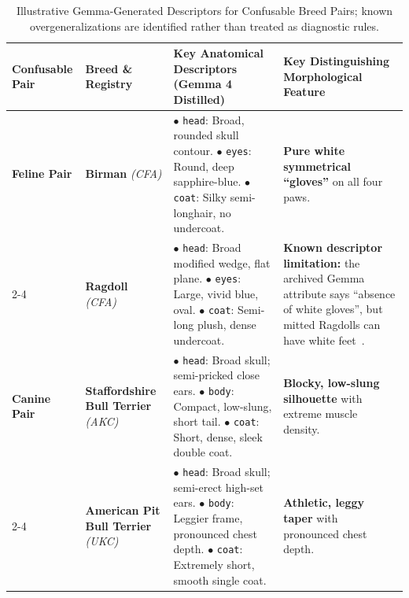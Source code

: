 \documentclass[conference]{IEEEtran}
\begin{document}
\begin{table}[t]
\centering
\caption{Illustrative Gemma-Generated Descriptors for Confusable Breed Pairs; known overgeneralizations are identified rather than treated as diagnostic rules.}
\label{tab:confusable_descriptors}
\vspace{2pt}
\footnotesize
\setlength{\tabcolsep}{5pt}
\renewcommand{\arraystretch}{1.05}
\begin{tabularx}{\textwidth}{p{1.8cm} p{2.2cm} p{6.8cm} X}
\toprule
\textbf{Confusable Pair} & \textbf{Breed \& Registry} & \textbf{Key Anatomical Descriptors (Gemma 4 Distilled)} & \textbf{Key Distinguishing Morphological Feature} \\
\midrule
\textbf{Feline Pair} & \textbf{Birman} \emph{(CFA)} & 
$\bullet$ \texttt{head}: Broad, rounded skull contour.\newline
$\bullet$ \texttt{eyes}: Round, deep sapphire-blue.\newline
$\bullet$ \texttt{coat}: Silky semi-longhair, no undercoat. & 
\textbf{Pure white symmetrical ``gloves''} on all four paws. \\
\cmidrule{2-4}
& \textbf{Ragdoll} \emph{(CFA)} & 
$\bullet$ \texttt{head}: Broad modified wedge, flat plane.\newline
$\bullet$ \texttt{eyes}: Large, vivid blue, oval.\newline
$\bullet$ \texttt{coat}: Semi-long plush, dense undercoat. & 
\textbf{Known descriptor limitation:} the archived Gemma attribute says ``absence of white gloves'', but mitted Ragdolls can have white feet~\cite{cfa_ragdoll}. \\
\midrule
\textbf{Canine Pair} & \textbf{Staffordshire Bull Terrier} \emph{(AKC)} & 
$\bullet$ \texttt{head}: Broad skull; semi-pricked close ears.\newline
$\bullet$ \texttt{body}: Compact, low-slung, short tail.\newline
$\bullet$ \texttt{coat}: Short, dense, sleek double coat. & 
\textbf{Blocky, low-slung silhouette} with extreme muscle density. \\
\cmidrule{2-4}
& \textbf{American Pit Bull Terrier} \emph{(UKC)} & 
$\bullet$ \texttt{head}: Broad skull; semi-erect high-set ears.\newline
$\bullet$ \texttt{body}: Leggier frame, pronounced chest depth.\newline
$\bullet$ \texttt{coat}: Extremely short, smooth single coat. & 
\textbf{Athletic, leggy taper} with pronounced chest depth. \\
\bottomrule
\end{tabularx}
\end{table}
\end{document}

